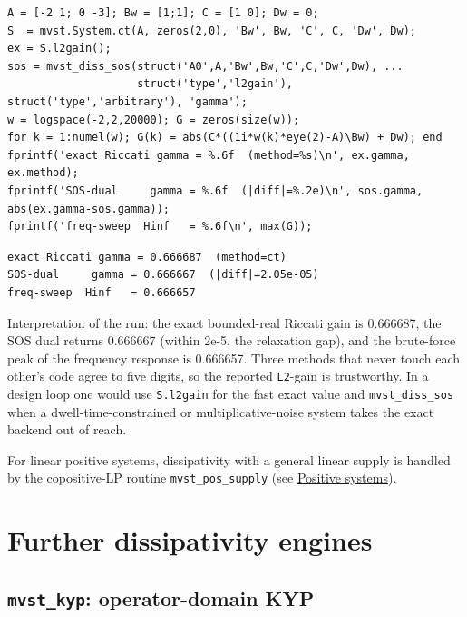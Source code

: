 \documentclass[11pt,oneside]{report}
\newcommand{\code}[1]{\texttt{#1}}
\begin{document}
\begin{lstlisting}[style=matlabstyle]
A = [-2 1; 0 -3]; Bw = [1;1]; C = [1 0]; Dw = 0;
S  = mvst.System.ct(A, zeros(2,0), 'Bw', Bw, 'C', C, 'Dw', Dw);
ex = S.l2gain();
sos = mvst_diss_sos(struct('A0',A,'Bw',Bw,'C',C,'Dw',Dw), ...
                    struct('type','l2gain'), struct('type','arbitrary'), 'gamma');
w = logspace(-2,2,20000); G = zeros(size(w));
for k = 1:numel(w); G(k) = abs(C*((1i*w(k)*eye(2)-A)\Bw) + Dw); end
fprintf('exact Riccati gamma = %.6f  (method=%s)\n', ex.gamma, ex.method);
fprintf('SOS-dual     gamma = %.6f  (|diff|=%.2e)\n', sos.gamma, abs(ex.gamma-sos.gamma));
fprintf('freq-sweep  Hinf   = %.6f\n', max(G));
\end{lstlisting}

\begin{lstlisting}[style=outputstyle]
exact Riccati gamma = 0.666687  (method=ct)
SOS-dual     gamma = 0.666667  (|diff|=2.05e-05)
freq-sweep  Hinf   = 0.666657
\end{lstlisting}

Interpretation of the run: the exact bounded-real Riccati gain is 0.666687, the SOS dual
returns 0.666667 (within 2e-5, the relaxation gap), and the brute-force peak of
the frequency response is 0.666657. Three methods that never touch each other's
code agree to five digits, so the reported \code{L2}-gain is trustworthy. In a design
loop one would use \code{S.l2gain} for the fast exact value and \code{mvst\_diss\_sos} when
a dwell-time-constrained or multiplicative-noise system takes the exact backend
out of reach.

For linear positive systems, dissipativity with a general linear supply is
handled by the copositive-LP routine \code{mvst\_pos\_supply} (see
\protect\hyperlink{chap:10-positive-systems}{Positive systems}).

\hypertarget{further-dissipativity-engines}{%
\section{Further dissipativity engines}\label{further-dissipativity-engines}}

\hypertarget{mvst_kyp-operator-domain-kyp}{%
\subsection{\texorpdfstring{\code{mvst\_kyp}: operator-domain KYP}{mvst\_kyp: operator-domain KYP}}\label{mvst_kyp-operator-domain-kyp}}
\end{document}
